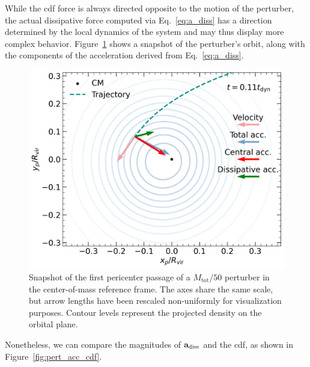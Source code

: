 \documentclass[twocolumn, a4paper]{article}
\begin{document}
While the \acrshort{cdf} force is always directed opposite to the motion of the perturber, the actual dissipative force computed via Eq.~\ref{eq:a_diss} has a direction determined by the local dynamics of the system and may thus display more complex behavior. Figure~\ref{fig:pert_snap_forces} shows a snapshot of the perturber’s orbit, along with the components of the acceleration derived from Eq.~\ref{eq:a_diss}.

\begin{figure}
    \centering
    \includegraphics[width=\columnwidth]{images/pert_snapshot_forces.png}
    \caption{Snapshot of the first pericenter passage of a \(M_\text{tot} / 50\) perturber in the center-of-mass reference frame. The axes share the same scale, but arrow lengths have been rescaled non-uniformly for visualization purposes. Contour levels represent the projected density on the orbital plane.}
    \label{fig:pert_snap_forces}
\end{figure}

Nonetheless, we can compare the magnitudes of \(\vb{a}_\text{diss}\) and the \acrshort{cdf}, as shown in Figure~\ref{fig:pert_acc_cdf}.
\end{document}
